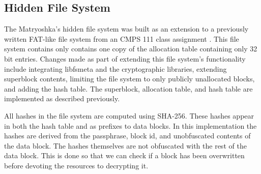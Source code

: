 \documentclass{article}
\begin{document}
\begin{multicols}{2}
\subsection{Hidden File System}
The Matryoshka's hidden file system was built as an extension to a previously written FAT-like file system from an CMPS 111 class assignment \cite{hackfs}. This file system contains only contains one copy of the allocation table containing only 32 bit entries. Changes made as part of extending this file system's functionality include integrating libfsmeta and the cryptographic libraries, extending superblock contents, limiting the file system to only publicly unallocated blocks, and adding the hash table. The superblock, allocation table, and hash table are implemented as described previously.

All hashes in the file system are computed using SHA-256. These hashes appear in both the hash table and as prefixes to data blocks. In this implementation the hashes are derived from the passphrase, block id, and unobfuscated contents of the data block. The hashes themselves are not obfuscated with the rest of the data block. This is done so that we can check if a block has been overwritten before devoting the resources to decrypting it.


\end{multicols}
\end{document}
